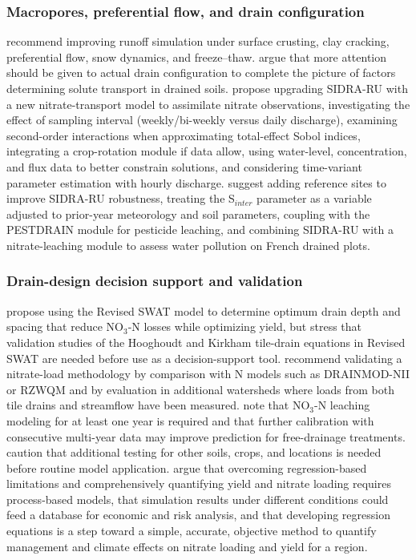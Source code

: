 \documentclass[11pt]{article}
\begin{document}
\subsubsection{Macropores, preferential flow, and drain configuration}
\textcite{Smith2020} recommend improving runoff simulation under surface crusting, clay cracking, preferential flow, snow dynamics, and freeze--thaw. \textcite{Stamm2002} argue that more attention should be given to actual drain configuration to complete the picture of factors determining solute transport in drained soils. \textcite{Chelil2022b} propose upgrading SIDRA-RU with a new nitrate-transport model to assimilate nitrate observations, investigating the effect of sampling interval (weekly/bi-weekly versus daily discharge), examining second-order interactions when approximating total-effect Sobol indices, integrating a crop-rotation module if data allow, using water-level, concentration, and flux data to better constrain solutions, and considering time-variant parameter estimation with hourly discharge. \textcite{Jeantet2021} suggest adding reference sites to improve SIDRA-RU robustness, treating the S$_{inter}$ parameter as a variable adjusted to prior-year meteorology and soil parameters, coupling with the PESTDRAIN module for pesticide leaching, and combining SIDRA-RU with a nitrate-leaching module to assess water pollution on French drained plots.

\subsubsection{Drain-design decision support and validation}
\textcite{Moriasi2013} propose using the Revised SWAT model to determine optimum drain depth and spacing that reduce NO$_3$-N losses while optimizing yield, but stress that validation studies of the Hooghoudt and Kirkham tile-drain equations in Revised SWAT are needed before use as a decision-support tool. \textcite{Ale2012} recommend validating a nitrate-load methodology by comparison with N models such as DRAINMOD-NII or RZWQM and by evaluation in additional watersheds where loads from both tile drains and streamflow have been measured. \textcite{Ng2000} note that NO$_3$-N leaching modeling for at least one year is required and that further calibration with consecutive multi-year data may improve prediction for free-drainage treatments. \textcite{Skaggs1995} caution that additional testing for other soils, crops, and locations is needed before routine model application. \textcite{Malone2007} argue that overcoming regression-based limitations and comprehensively quantifying yield and nitrate loading requires process-based models, that simulation results under different conditions could feed a database for economic and risk analysis, and that developing regression equations is a step toward a simple, accurate, objective method to quantify management and climate effects on nitrate loading and yield for a region.
\end{document}
